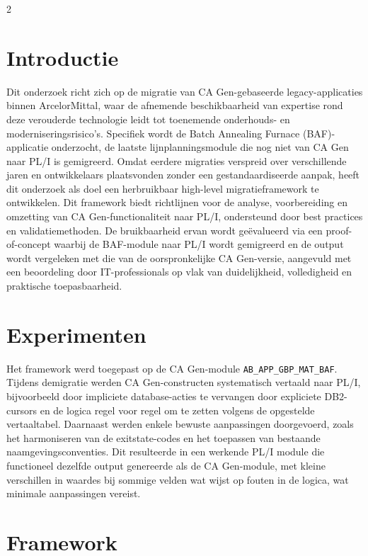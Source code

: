 \documentclass[a0,portrait]{hogent-poster}
\begin{document}
\begin{multicols}{2} %

\section{Introductie}

Dit onderzoek richt zich op de migratie van CA Gen-gebaseerde legacy-applicaties binnen ArcelorMittal, waar de afnemende beschikbaarheid van expertise rond deze verouderde technologie leidt tot toenemende onderhouds- en moderniseringsrisico’s. Specifiek wordt de Batch Annealing Furnace (BAF)-applicatie onderzocht, de laatste lijnplanningsmodule die nog niet van CA Gen naar PL/I is gemigreerd. Omdat eerdere migraties verspreid over verschillende jaren en ontwikkelaars plaatsvonden zonder een gestandaardiseerde aanpak, heeft dit onderzoek als doel een herbruikbaar high-level migratieframework te ontwikkelen. Dit framework biedt richtlijnen voor de analyse, voorbereiding en omzetting van CA Gen-functionaliteit naar PL/I, ondersteund door best practices en validatiemethoden. De bruikbaarheid ervan wordt geëvalueerd via een proof-of-concept waarbij de BAF-module naar PL/I wordt gemigreerd en de output wordt vergeleken met die van de oorspronkelijke CA Gen-versie, aangevuld met een beoordeling door IT-professionals op vlak van duidelijkheid, volledigheid en praktische toepasbaarheid.


\section{Experimenten}

Het framework werd toegepast op de CA Gen-module \texttt{AB\_APP\_GBP\_MAT\_BAF}.
Tijdens demigratie werden CA Gen-constructen systematisch vertaald naar PL/I, bijvoorbeeld door impliciete database-acties te vervangen door expliciete DB2-cursors en de logica regel voor regel om te zetten volgens de opgestelde vertaaltabel. Daarnaast werden enkele bewuste aanpassingen doorgevoerd, zoals het harmoniseren van de exitstate-codes en het toepassen van bestaande naamgevingsconventies. Dit resulteerde in een werkende PL/I module die functioneel dezelfde output genereerde als de CA Gen-module, met kleine verschillen in waardes bij sommige velden wat wijst op fouten in de logica, wat minimale aanpassingen vereist.

\section{Framework}


\end{multicols}
\end{document}
